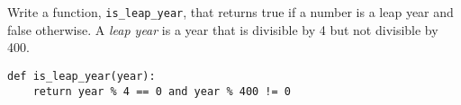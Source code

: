 \begin{blocksection}
\question Write a function, \lstinline$is_leap_year$, that returns true if a number is a leap year and false otherwise.
A \emph{leap year} is a year that is divisible by 4 but not divisible by 400.

\begin{solution}[2in]
\begin{lstlisting}
def is_leap_year(year):
    return year % 4 == 0 and year % 400 != 0
\end{lstlisting}
\end{solution}
\end{blocksection}
